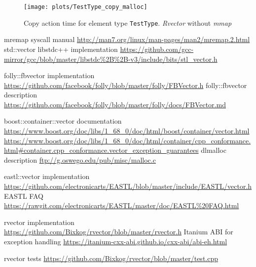 \documentclass[inz, english, shortabstract]{iithesis}
\begin{document}
\begin{figure}[h!]
\caption{Copy action time for element type \lstinline{TestType}. {\it Rvector} without {\it mmap}}
\label{TestType_copy_malloc}
\texttt{[image: plots/TestType\_copy\_malloc]}
\end{figure}



\begin{thebibliography}{1}
 mremap syscall manual \url{http://man7.org/linux/man-pages/man2/mremap.2.html}
 std::vector libstdc++ implementation \url{https://github.com/gcc-mirror/gcc/blob/master/libstdc%2B%2B-v3/include/bits/stl_vector.h}

 folly::fbvector implementation \url{https://github.com/facebook/folly/blob/master/folly/FBVector.h}
 folly::fbvector description \url{https://github.com/facebook/folly/blob/master/folly/docs/FBVector.md}

 boost::container::vector documentation \url{https://www.boost.org/doc/libs/1_68_0/doc/html/boost/container/vector.html}
 \url{https://www.boost.org/doc/libs/1_68_0/doc/html/container/cpp_conformance.html#container.cpp_conformance.vector_exception_guarantees}
 dlmalloc description \url{ftp://g.oswego.edu/pub/misc/malloc.c}

 eastl::vector implementation \url{https://github.com/electronicarts/EASTL/blob/master/include/EASTL/vector.h}
 EASTL FAQ \url{https://rawgit.com/electronicarts/EASTL/master/doc/EASTL%20FAQ.html}

 rvector implementation \url{https://github.com/Bixkog/rvector/blob/master/rvector.h}
 Itanium ABI for exception handling \url{https://itanium-cxx-abi.github.io/cxx-abi/abi-eh.html}

 rvector tests \url{https://github.com/Bixkog/rvector/blob/master/test.cpp}
\end{thebibliography}


\listoffigures
\lstlistoflistings
\end{document}

